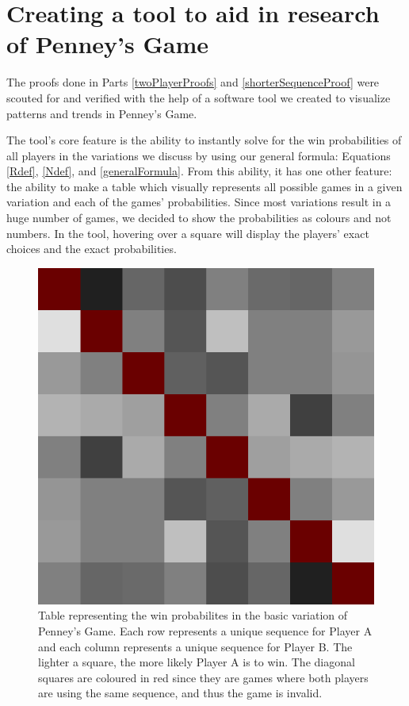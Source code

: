 \documentclass[english,12pt,a4paper,final]{article}
\begin{document}
\section {Creating a tool to aid in research of Penney's Game}

The proofs done in Parts \ref{twoPlayerProofs} and \ref{shorterSequenceProof} were scouted for and verified with the help of a software tool we created to visualize patterns and trends in Penney's Game.

The tool's core feature is the ability to instantly solve for the win probabilities of all players in the variations we discuss by using our general formula: Equations \eqref{Rdef}, \eqref{Ndef}, and \eqref{generalFormula}. From this ability, it has one other feature: the ability to make a table which visually represents all possible games in a given variation and each of the games' probabilities. Since most variations result in a huge number of games, we decided to show the probabilities as colours and not numbers. In the tool, hovering over a square will display the players' exact choices and the exact probabilities.

\begin{figure}[H]
	\centering
	\includegraphics[width=0.7\linewidth]{s2k3}
	\caption{Table representing the win probabilites in the basic variation of Penney's Game. Each row represents a unique sequence for Player A and each column represents a unique sequence for Player B. The lighter a square, the more likely Player A is to win. The diagonal squares are coloured in red since they are games where both players are using the same sequence, and thus the game is invalid.}
	\label{fig:s2k3}
\end{figure}
\end{document}
